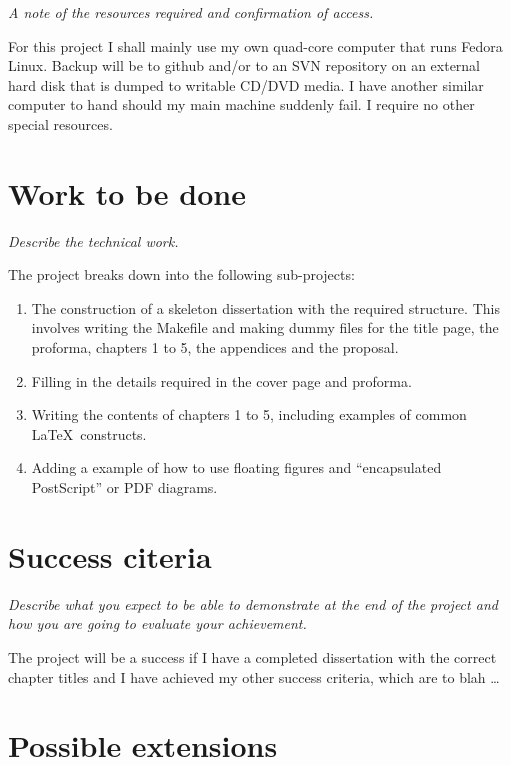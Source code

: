 \documentclass[12pt,a4paper,twoside]{article}
\begin{document}
\emph{A note of the resources required and confirmation of access.}

For this project I shall mainly use my own quad-core computer that
runs Fedora Linux. Backup will be to github and/or to an SVN
repository on an external hard disk that is dumped to writable CD/DVD
media. I have another similar computer to hand should my main machine
suddenly fail. I require no other special resources.

\section*{Work to be done}

\emph{Describe the technical work.}

The project breaks down into the following sub-projects:

\begin{enumerate}

\item The construction of a skeleton dissertation with the required
  structure. This involves writing the Makefile and making dummy
  files for the title page, the proforma, chapters 1 to 5, the
  appendices and the proposal.

\item Filling in the details required in the cover page and proforma.

\item Writing the contents of chapters 1 to 5, including examples of
  common \LaTeX\ constructs.

\item Adding a example of how to use floating figures and ``encapsulated
  PostScript'' or PDF diagrams.

\end{enumerate}

\section*{Success citeria}

\emph{Describe what you expect to be able to demonstrate at the
end of the project and how you are going to evaluate your achievement.}

The project will be a success if I have a completed dissertation with
the correct chapter titles and I have achieved my other success
criteria, which are to blah \ldots


\section*{Possible extensions}
\end{document}
